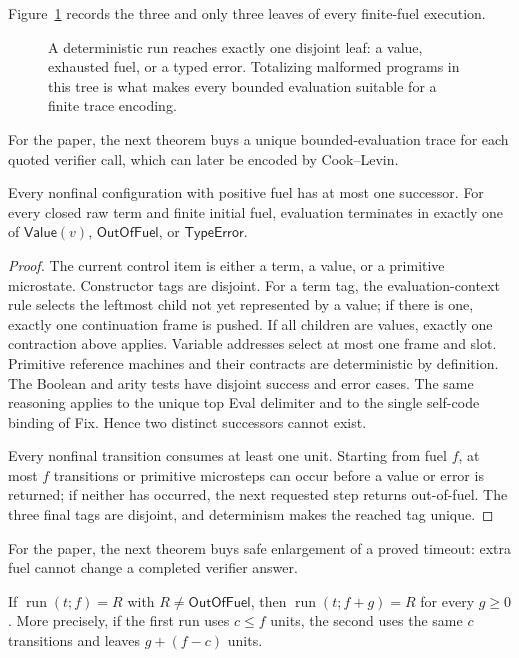 Figure~\ref{fig:trichotomy} records the three and only three leaves of every
finite-fuel execution.
\begin{figure}[t]
\centering

\caption{A deterministic run reaches exactly one disjoint leaf: a value, exhausted fuel, or a typed error.  Totalizing malformed programs in this tree is what makes every bounded evaluation suitable for a finite trace encoding.}
\label{fig:trichotomy}
\end{figure}

For the paper, the next theorem buys a unique bounded-evaluation trace for
each quoted verifier call, which can later be encoded by Cook--Levin.
\begin{theorem}
\label{thm:l-determinism}\enspace%
Every nonfinal configuration with positive fuel has at most one successor.
For every closed raw term and finite initial fuel, evaluation terminates in
exactly one of \(\mathsf{Value}(v)\), \(\mathsf{OutOfFuel}\), or
\(\mathsf{TypeError}\).
\end{theorem}

\begin{proof}
The current control item is either a term, a value, or a primitive microstate.
Constructor tags are disjoint.  For a term tag, the evaluation-context rule
selects the leftmost child not yet represented by a value; if there is one,
exactly one continuation frame is pushed.  If all children are values, exactly
one contraction above applies.  Variable addresses select at most one frame
and slot.  Primitive reference machines and their contracts are deterministic
by definition.  The Boolean and arity tests have disjoint success and error
cases.  The same reasoning applies to the unique top Eval delimiter and to the
single self-code binding of Fix.  Hence two distinct successors cannot exist.

Every nonfinal transition consumes at least one unit.  Starting from fuel
\(f\), at most \(f\) transitions or primitive microsteps can occur before a
value or error is returned; if neither has occurred, the next requested step
returns out-of-fuel.  The three final tags are disjoint, and determinism makes
the reached tag unique.
\end{proof}

For the paper, the next theorem buys safe enlargement of a proved timeout:
extra fuel cannot change a completed verifier answer.
\begin{theorem}
\label{thm:fuel-monotonicity}\enspace%
If \(\operatorname{run}(t;f)=R\) with
\(R\neq\mathsf{OutOfFuel}\), then
\(\operatorname{run}(t;f+g)=R\) for every \(g\geq0\).  More precisely, if the
first run uses \(c\leq f\) units, the second uses the same \(c\) transitions
and leaves \(g+(f-c)\) units.
\end{theorem}

